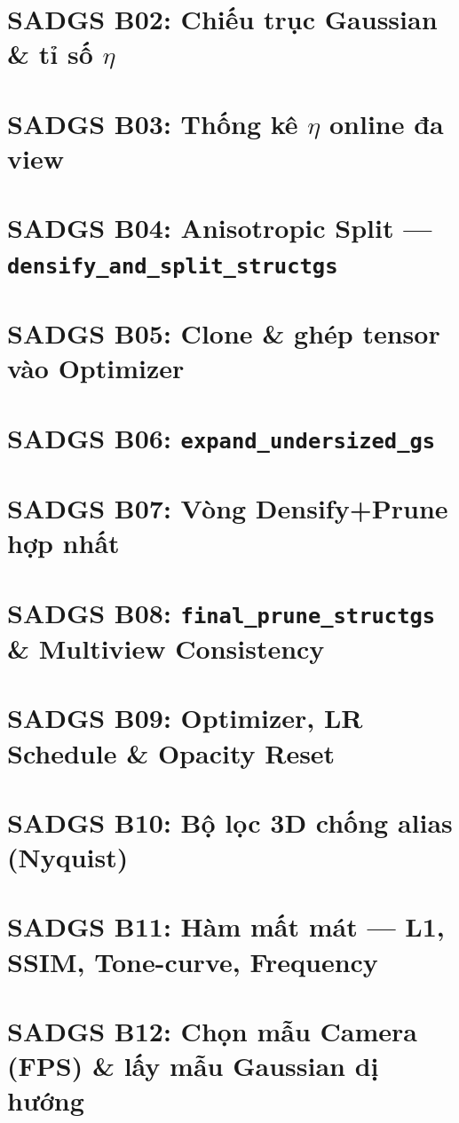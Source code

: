 \section{SADGS B02: Chiếu trục Gaussian \& tỉ số $\eta$}

\section{SADGS B03: Thống kê $\eta$ online đa view}

\section{SADGS B04: Anisotropic Split --- \texttt{densify\_and\_split\_structgs}}

\section{SADGS B05: Clone \& ghép tensor vào Optimizer}

\section{SADGS B06: \texttt{expand\_undersized\_gs}}

\section{SADGS B07: Vòng Densify+Prune hợp nhất}

\section{SADGS B08: \texttt{final\_prune\_structgs} \& Multiview Consistency}

\section{SADGS B09: Optimizer, LR Schedule \& Opacity Reset}

\section{SADGS B10: Bộ lọc 3D chống alias (Nyquist)}

\section{SADGS B11: Hàm mất mát --- L1, SSIM, Tone-curve, Frequency}

\section{SADGS B12: Chọn mẫu Camera (FPS) \& lấy mẫu Gaussian dị hướng}

